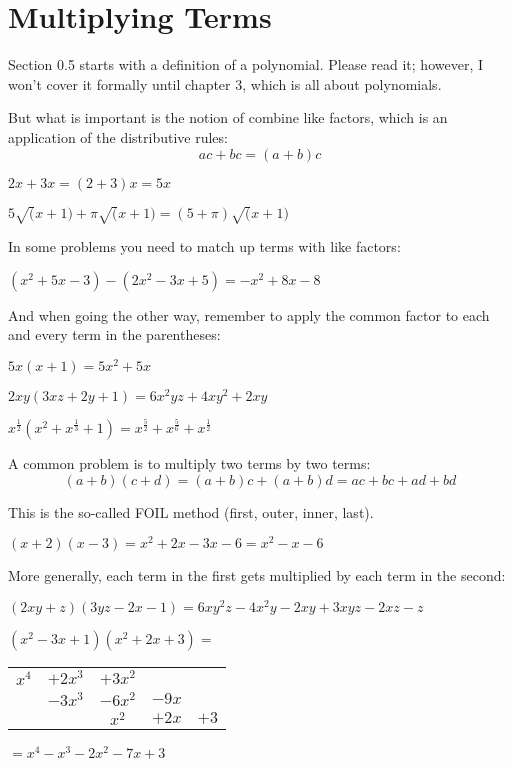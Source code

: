 \documentclass[letterpaper,12pt,fleqn]{article}
\begin{document}
\section*{Multiplying Terms}

Section 0.5 starts with a definition of a polynomial. Please read it; however,
I won't cover it formally until chapter 3, which is all about polynomials.

But what is important is the notion of combine like factors, which is an
application of the distributive rules:
\[ac+bc=(a+b)c\]

\begin{example}
  $2x+3x=(2+3)x=5x$

  $5\sqrt(x+1)+\pi\sqrt(x+1)=(5+\pi)\sqrt(x+1)$
\end{example}

In some problems you need to match up terms with like factors:

\begin{example}
  $(x^2+5x-3)-(2x^2-3x+5)=-x^2+8x-8$
\end{example}

And when going the other way, remember to apply the common factor to each and
every term in the parentheses:

\begin{example}
  $5x(x+1)=5x^2+5x$

  $2xy(3xz+2y+1)=6x^2yz+4xy^2+2xy$

  $x^{\frac{1}{2}}(x^2+x^{\frac{1}{3}}+1)=x^{\frac{5}{2}}+x^{\frac{5}{6}}+x^{\frac{1}{2}}$
\end{example}

A common problem is to multiply two terms by two terms:
\[(a+b)(c+d)=(a+b)c+(a+b)d=ac+bc+ad+bd\]

This is the so-called FOIL method (first, outer, inner, last).

\begin{example}
  $(x+2)(x-3)=x^2+2x-3x-6=x^2-x-6$
\end{example}

More generally, each term in the first gets multiplied by each term in the
second:

\begin{example}
  $(2xy+z)(3yz-2x-1)=6xy^2z-4x^2y-2xy+3xyz-2xz-z$

  $(x^2-3x+1)(x^2+2x+3)=$
  \begin{tabular}{ccccc}
    $x^4$ & $+2x^3$ & $+3x^2$ & & \\
    & $-3x^3$ & $-6x^2$ & $-9x$ & \\
    & & $x^2$ & $+2x$ & $+3$ \\
  \end{tabular}
  $=x^4-x^3-2x^2-7x+3$
\end{example}
\end{document}
